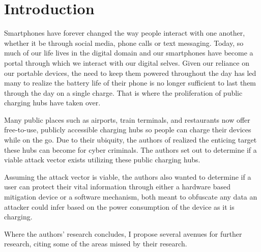 \section{Introduction}
\label{sec:intro}
Smartphones have forever changed the way people interact with one another, whether it be through social media, phone calls or text messaging. Today, so much of our life lives in the digital domain and our smartphones have become a portal through which we interact with our digital selves. Given our reliance on our portable devices, the need to keep them powered throughout the day has led many to realize the battery life of their phone is no longer sufficient to last them through the day on a single charge. That is where the proliferation of public charging hubs have taken over. 

Many public places such as airports, train terminals, and restaurants now offer free-to-use, publicly accessible charging hubs so people can charge their devices while on the go. Due to their ubiquity, the authors of \papertitle{} realized the enticing target these hubs can become for cyber criminals. The authors set out to determine if a viable attack vector exists utilizing these public charging hubs. 

Assuming the attack vector is viable, the authors also wanted to determine if a user can protect their vital information through either a hardware based mitigation device or a software mechanism, both meant to obfuscate any data an attacker could infer based on the power consumption of the device as it is charging. 

Where the authors' research concludes, I propose several avenues for further research, citing some of the areas missed by their research. 